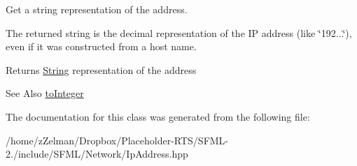 Get a string representation of the address. 

The returned string is the decimal representation of the I\-P address (like \char`\"{}192...\char`\"{}), even if it was constructed from a host name.

\begin{DoxyReturn}{Returns}
\hyperlink{classsf_1_1String}{String} representation of the address
\end{DoxyReturn}
\begin{DoxySeeAlso}{See Also}
\hyperlink{classsf_1_1IpAddress_af42678b08b23def2560aed7d98b24d89}{to\-Integer} 
\end{DoxySeeAlso}


The documentation for this class was generated from the following file\-:\begin{DoxyCompactItemize}
\item 
/home/z\-Zelman/\-Dropbox/\-Placeholder-\/\-R\-T\-S/\-S\-F\-M\-L-\/2./include/\-S\-F\-M\-L/\-Network/Ip\-Address.\-hpp\end{DoxyCompactItemize}
